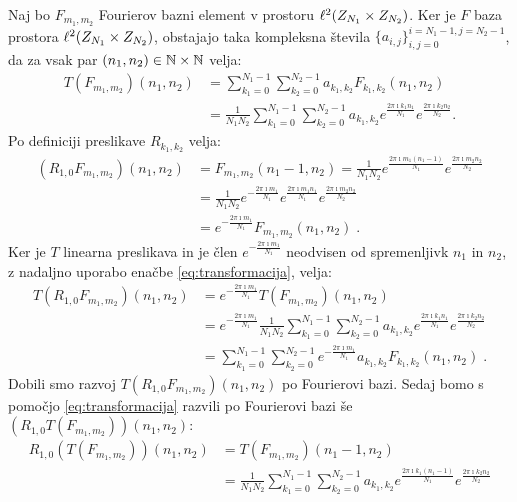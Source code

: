 \begin{dokaz}
Naj bo $F_{m_1, m_2}$ Fourierov bazni element v prostoru $\ell^2(Z_{N_1} \times Z_{N_2})$. Ker je $F$ baza prostora $\ell^2(Z_{N_1} \times Z_{N_2})$, obstajajo taka kompleksna števila $\{a_{i, j}\}_{i, j = 0}^{i = N_1 - 1, j = N_2 - 1}$, da za vsak par $(n_1, n_2) \in \mathbb N \times \mathbb N$ velja:
%
\begin{align}\label{eq:transformacija} %
  T(F_{m_1, m_2})(n_1, n_2) & = \sum_{k_1=0}^{N_1-1} \sum_{k_2=0}^{N_2-1} a_{k_1, k_2} F_{k_1, k_2}(n_1, n_2) \\
 & = \frac{1}{N_1N_2} \sum_{k_1=0}^{N_1-1} \sum_{k_2=0}^{N_2-1} a_{k_1, k_2} e^{\frac{2\pi \imath k_1n_1}{N_1}} e^{\frac{2\pi \imath k_2n_2}{N_2}}.
\end{align}
%
Po definiciji preslikave $R_{k_1, k_2}$ velja:
%
\begin{align*}
(R_{1, 0} F_{m_1, m_2})(n_1, n_2) & = F_{m_1, m_2}(n_1-1, n_2) = \frac{1}{N_1N_2} e^{\frac{2\pi \imath m_1(n_1-1)}{N_1}} e^{\frac{2\pi \imath m_2n_2}{N_2}} \\
& = \frac{1}{N_1N_2} e^{-\frac{2\pi \imath m_1}{N_1}} e^{\frac{2\pi \imath m_1n_1}{N_1}} e^{\frac{2\pi \imath m_2n_2}{N_2}} \\
& =  e^{-\frac{2\pi \imath m_1}{N_1}} F_{m_1, m_2}(n_1, n_2) \;.
\end{align*}
%
Ker je $T$ linearna preslikava in je člen $e^{-\frac{2\pi \imath m_1}{N_1}}$ neodvisen od spremenljivk $n_1$ in $n_2$, z nadaljno uporabo enačbe \eqref{eq:transformacija}, velja:
%
\begin{align*}
T(R_{1, 0} F_{m_1, m_2})(n_1, n_2) & = e^{-\frac{2\pi \imath m_1}{N_1}} T(F_{m_1, m_2})(n_1, n_2) \\
& = e^{-\frac{2\pi \imath m_1}{N_1}} \frac{1}{N_1N_2} \sum_{k_1=0}^{N_1-1} \sum_{k_2=0}^{N_2-1} a_{k_1, k_2} e^{\frac{2\pi \imath k_1n_1}{N_1}} e^{\frac{2\pi \imath k_2n_2}{N_2}} \\
& =  \sum_{k_1=0}^{N_1-1} \sum_{k_2=0}^{N_2-1} e^{-\frac{2\pi \imath m_1}{N_1}} a_{k_1, k_2} F_{k_1, k_2}(n_1, n_2) \;.
\end{align*}
%
Dobili smo razvoj $T(R_{1, 0} F_{m_1, m_2})(n_1, n_2)$ po Fourierovi bazi. Sedaj bomo s pomočjo \eqref{eq:transformacija} razvili po Fourierovi bazi še $(R_{1, 0} T(F_{m_1, m_2}))(n_1, n_2)$:
%
\begin{align*}
R_{1, 0} (T(F_{m_1, m_2}))(n_1, n_2) & = T(F_{m_1, m_2})(n_1-1, n_2) \\
& = \frac{1}{N_1N_2} \sum_{k_1=0}^{N_1-1} \sum_{k_2=0}^{N_2-1} a_{k_1, k_2} e^{\frac{2\pi \imath k_1(n_1-1)}{N_1}} e^{\frac{2\pi \imath k_2n_2}{N_2}} \\

\end{align*}
\end{dokaz}
